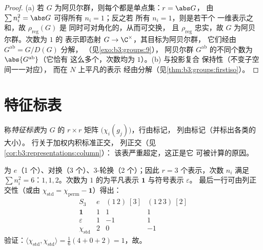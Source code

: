 \begin{proof}
(a) 若 $G$ 为阿贝尔群，则每个都是单点集：$r = \abs G$，
由 $\sum n_i^2 = \abs G$ 可得所有 $n_i = 1$；反之若
所有 $n_i = 1$，则是若干个
一维表示之和，故 $\rho_{\mathrm{reg}}(G)$ 是
同时可对角化的，从而可交换，
且 $\rho_{\mathrm{reg}}$ 忠实，故 $G$ 为阿贝尔群。次数为 $1$ 的
表示即态射 $G \to \C^\times$，其目标为阿贝尔群，
它们经由 $G^{\mathrm{ab}} = G/D(G)$ 分解，
（见\cref{exo:b3:groups:9}），
阿贝尔群 $G^{\mathrm{ab}}$ 的不同个数为 $\abs{G^{\mathrm{ab}}}$（它恰有
这么多个，次数均为 $1$）。(b) 与投影复合
保持性（不变子空间一一对应），
而在 $N$ 上平凡的表示
经由分解（见\cref{thm:b3:groups:firstiso}）。
\end{proof}

\section{特征标表}

\begin{definition}\label{def:b3:representations:table}
称\emph{特征标表}为 $G$ 的
$r \times r$ 矩阵 $\bigl(\chi_i(g_j)\bigr)$，行由标记，
列由标记（并标出各类的大小）。
行关于加权内积标准正交，
列正交（见\cref{cor:b3:representations:column}）：
该表严重超定，这正是它
可被计算的原因。
\end{definition}

\begin{example}[$S_3$ 的特征标表]\label{ex:b3:representations:s3}
为 $e$（1 个）、对换（3 个）、$3$-轮换（2 个）；因此 $r
= 3$ 个表示，次数 $n_i$ 满足 $\sum n_i^2 = 6$：$1, 1,
2$。次数为 $1$ 的为平凡表示 $\mathbf 1$ 与符号表示 $\varepsilon$。
最后一行可由列正交性（或由
$\chi_{\mathrm{std}} = \chi_{\mathrm{perm}} - \mathbf 1$）得出：
\[
\begin{array}{c|ccc}
S_3 & e & (1\,2)\ [3] & (1\,2\,3)\ [2]\\
\hline
\mathbf 1 & 1 & 1 & 1\\
\varepsilon & 1 & -1 & 1\\
\chi_{\mathrm{std}} & 2 & 0 & -1
\end{array}
\]
验证：$\langle\chi_{\mathrm{std}},\chi_{\mathrm{std}}\rangle =
\frac{1}{6}(4 + 0 + 2) = 1$，故。
\end{example}


